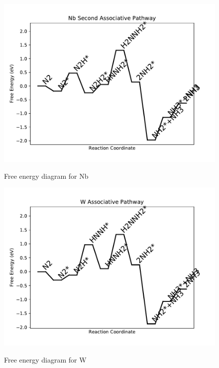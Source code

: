 \documentclass{article}
\begin{document}
\newpage
\begin{figure}
\includegraphics[width=1\linewidth]{data/plots/Nb_associative_2.pdf}
\label{fig:Nb_associative_2}
\caption{Free energy diagram for Nb}
\end{figure}

\begin{figure}
\includegraphics[width=1\linewidth]{data/plots/W_associative.pdf}
\label{fig:W_associative}
\caption{Free energy diagram for W}
\end{figure}
\end{document}
